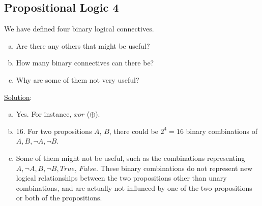 \documentclass[11pt, answers]{exam}
\begin{document}
%
%
\begin{questions}
\section{Propositional Logic 4}
\question

We have defined four binary logical connectives.

\begin{enumerate}[a.]
	\item Are there any others that might be useful?
	\item How many binary connectives can there be?
	\item Why are some of them not very useful?
\end{enumerate}

\underline{Solution}:
\begin{enumerate}[a.]
	\item Yes. For instance, $xor$ ($\oplus$).
	\item 16. For two propositions $A$, $B$, there could be $2^4 = 16$ binary combinations of $A, B, \neg A, \neg B$. 
	\item Some of them might not be useful, such as the combinations representing $A, \neg A, B, \neg B, True$, $False$. These binary combinations do not represent new logical relationships between the two propositions other than unary combinations, and are actually not influnced by one of the two propositions or both of the propositions.  
\end{enumerate}
\end{questions}
\end{document}
